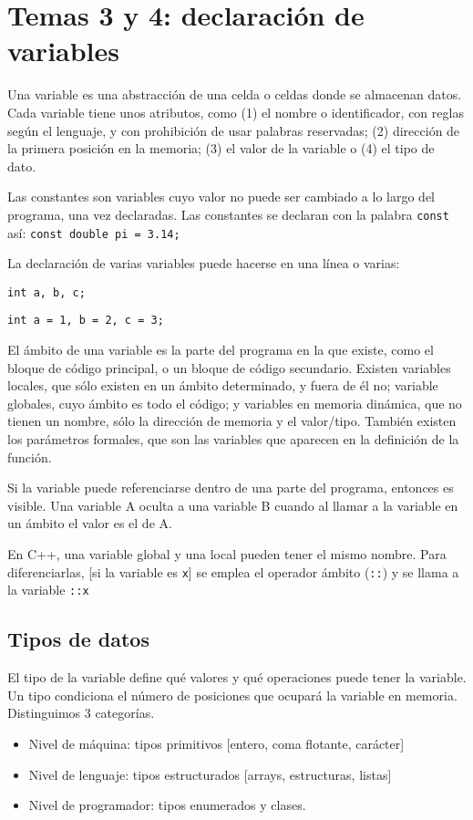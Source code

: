 \documentclass[a4paper]{article}
\begin{document}
	\section{Temas 3 y 4: declaración de variables}
	
	Una variable es una abstracción de una celda o celdas donde se almacenan datos. Cada variable tiene unos atributos, como (1) el nombre o identificador, con reglas según el lenguaje, y con prohibición de usar palabras reservadas; (2) dirección de la primera posición en la memoria; (3) el valor de la variable o (4) el tipo de dato.
	
	Las constantes son variables cuyo valor no puede ser cambiado a lo largo del programa, una vez declaradas. Las constantes se declaran con la palabra \verb|const| así: \verb|const double pi = 3.14;|
	
	La declaración de varias variables puede hacerse en una línea o varias:
	
	\verb|int a, b, c;|
	
	\verb|int a = 1, b = 2, c = 3;|
	
	El ámbito de una variable es la parte del programa en la que existe, como el bloque de código principal, o un bloque de código secundario. Existen variables locales, que sólo existen en un ámbito determinado, y fuera de él no; variable globales, cuyo ámbito es todo el código; y variables en memoria dinámica, que no tienen un nombre, sólo la dirección de memoria y el valor/tipo. También existen los parámetros formales, que son las variables que aparecen en la definición de la función.
	
	Si la variable puede referenciarse dentro de una parte del programa, entonces es visible. Una variable A oculta a una variable B cuando al llamar a la variable en un ámbito el valor es el de A.
	
	En C++, una variable global y una local pueden tener el mismo nombre. Para diferenciarlas, [si la variable es \verb|x|] se emplea el operador ámbito (\verb|::|) y se llama a la variable \verb|::x|
	
	\subsection{Tipos de datos}
	El tipo de la variable define qué valores y qué operaciones puede tener la variable. Un tipo condiciona el número de posiciones que ocupará la variable en memoria. Distinguimos 3 categorías. 
	\begin{itemize}
		\item Nivel de máquina: tipos primitivos [entero, coma flotante, carácter]
		\item Nivel de lenguaje: tipos estructurados [arrays, estructuras, listas]
		\item Nivel de programador: tipos enumerados y clases.
	\end{itemize}
	
\end{document}
